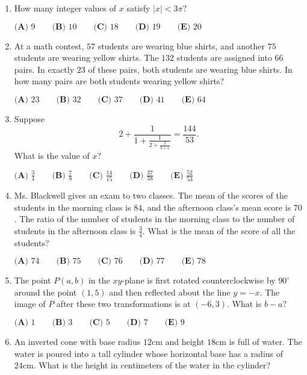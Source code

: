 \documentclass{article}
\begin{document}
\begin{enumerate}[label=\arabic*., itemsep=0.5em]\item How many integer values of \(x\) satisfy \(|x|<3\pi?\)

\(\textbf{(A) }9 \qquad \textbf{(B) }10 \qquad \textbf{(C) }18 \qquad \textbf{(D) }19 \qquad \textbf{(E) }20\)\par \vspace{0.5em}\item At a math contest, \(57\) students are wearing blue shirts, and another \(75\) students are wearing yellow shirts. The \(132\) students are assigned into \(66\) pairs. In exactly \(23\) of these pairs, both students are wearing blue shirts. In how many pairs are both students wearing yellow shirts?

\(\textbf{(A) }23 \qquad \textbf{(B) }32 \qquad \textbf{(C) }37 \qquad \textbf{(D) }41 \qquad \textbf{(E) }64\)\par \vspace{0.5em}\item Suppose
\begin{equation*}
2+\frac{1}{1+\frac{1}{2+\frac{2}{3+x}}}=\frac{144}{53}.
\end{equation*}
What is the value of \(x?\)

\(\textbf{(A) }\frac34 \qquad \textbf{(B) }\frac78 \qquad \textbf{(C) }\frac{14}{15} \qquad \textbf{(D) }\frac{37}{38} \qquad \textbf{(E) }\frac{52}{53}\)\par \vspace{0.5em}\item Ms. Blackwell gives an exam to two classes. The mean of the scores of the students in the morning class is \(84\), and the afternoon class's mean score is \(70\). The ratio of the number of students in the morning class to the number of students in the afternoon class is \(\frac34\). What is the mean of the score of all the students?

\(\textbf{(A) }74 \qquad \textbf{(B) }75 \qquad \textbf{(C) }76 \qquad \textbf{(D) }77 \qquad \textbf{(E) }78\)\par \vspace{0.5em}\item The point \(P(a,b)\) in the \(xy\)-plane is first rotated counterclockwise by \(90^\circ\) around the point \((1,5)\) and then reflected about the line \(y=-x\). The image of \(P\) after these two transformations is at \((-6,3)\). What is \(b-a?\)

\(\textbf{(A) }1 \qquad \textbf{(B) }3 \qquad \textbf{(C) }5 \qquad \textbf{(D) }7 \qquad \textbf{(E) }9\)\par \vspace{0.5em}\item An inverted cone with base radius \(12 \text{cm}\) and height \(18\text{cm}\) is full of water. The water is poured into a tall cylinder whose horizontal base has a radius of \(24\text{cm}\). What is the height in centimeters of the water in the cylinder?


\end{enumerate}
\end{document}
